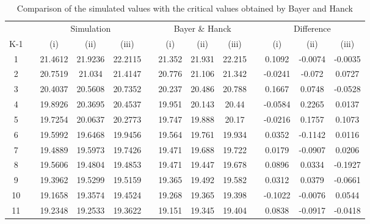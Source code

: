 \documentclass[12pt,a4paper]{article}
\begin{document}
\begin{table}[!h]

\caption{\label{tab:unnamed-chunk-6}\label{tab:com} Comparison of the simulated values with the critical values obtained by Bayer and Hanck 
}
\centering
\fontsize{8}{10}\selectfont
\begin{tabular}[t]{ccccccccccccc}
\toprule
\multicolumn{1}{c}{ } & \multicolumn{1}{c}{} & \multicolumn{3}{c}{Simulation} & \multicolumn{1}{c}{} & \multicolumn{3}{c}{Bayer \& Hanck} & \multicolumn{1}{c}{} & \multicolumn{3}{c}{Difference} \\
\cmidrule(l{3pt}r{3pt}){3-5} \cmidrule(l{3pt}r{3pt}){7-9} \cmidrule(l{3pt}r{3pt}){11-13}
K-1 &  & (i)  & (ii) & (iii) &  & (i)  & (ii) & (iii) &  & (i)  & (ii) & (iii)\\
\midrule
\rowcolor{gray!6}  1 &  & 21.4612 & 21.9236 & 22.2115 &  & 21.352 & 21.931 & 22.215 &  & 0.1092 & -0.0074 & -0.0035\\
2 &  & 20.7519 & 21.034 & 21.4147 &  & 20.776 & 21.106 & 21.342 &  & -0.0241 & -0.072 & 0.0727\\
\rowcolor{gray!6}  3 &  & 20.4037 & 20.5608 & 20.7352 &  & 20.237 & 20.486 & 20.788 &  & 0.1667 & 0.0748 & -0.0528\\
4 &  & 19.8926 & 20.3695 & 20.4537 &  & 19.951 & 20.143 & 20.44 &  & -0.0584 & 0.2265 & 0.0137\\
\rowcolor{gray!6}  5 &  & 19.7254 & 20.0637 & 20.2773 &  & 19.747 & 19.888 & 20.17 &  & -0.0216 & 0.1757 & 0.1073\\
6 &  & 19.5992 & 19.6468 & 19.9456 &  & 19.564 & 19.761 & 19.934 &  & 0.0352 & -0.1142 & 0.0116\\
\rowcolor{gray!6}  7 &  & 19.4889 & 19.5973 & 19.7426 &  & 19.471 & 19.688 & 19.722 &  & 0.0179 & -0.0907 & 0.0206\\
8 &  & 19.5606 & 19.4804 & 19.4853 &  & 19.471 & 19.447 & 19.678 &  & 0.0896 & 0.0334 & -0.1927\\
\rowcolor{gray!6}  9 &  & 19.3962 & 19.5299 & 19.5159 &  & 19.365 & 19.492 & 19.582 &  & 0.0312 & 0.0379 & -0.0661\\
10 &  & 19.1658 & 19.3574 & 19.4524 &  & 19.268 & 19.365 & 19.398 &  & -0.1022 & -0.0076 & 0.0544\\
\rowcolor{gray!6}  11 &  & 19.2348 & 19.2533 & 19.3622 &  & 19.151 & 19.345 & 19.404 &  & 0.0838 & -0.0917 & -0.0418\\
\bottomrule
\end{tabular}
\end{table}
\end{document}
